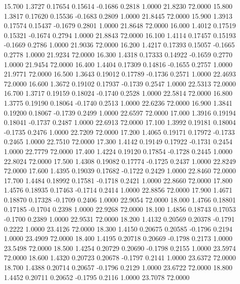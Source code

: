  15.700   1.3727   0.17654   0.15614  -0.1686   0.2818   1.0000  21.8230  72.0000
  15.800   1.3817   0.17620   0.15536  -0.1683   0.2809   1.0000  21.8445  72.0000
  15.900   1.3913   0.17574   0.15437  -0.1679   0.2801   1.0000  21.8648  72.0000
  16.000   1.4012   0.17519   0.15321  -0.1674   0.2794   1.0000  21.8843  72.0000
  16.100   1.4114   0.17457   0.15193  -0.1669   0.2786   1.0000  21.9036  72.0000
  16.200   1.4217   0.17393   0.15057  -0.1665   0.2778   1.0000  21.9234  72.0000
  16.300   1.4318   0.17333   0.14922  -0.1659   0.2770   1.0000  21.9454  72.0000
  16.400   1.4404   0.17309   0.14816  -0.1655   0.2757   1.0000  21.9771  72.0000
  16.500   1.3643   0.19012   0.17789  -0.1736   0.2571   1.0000  22.4693  72.0000
  16.600   1.3672   0.19102   0.17937  -0.1739   0.2547   1.0000  22.5313  72.0000
  16.700   1.3717   0.19159   0.18024  -0.1740   0.2528   1.0000  22.5814  72.0000
  16.800   1.3775   0.19190   0.18064  -0.1740   0.2513   1.0000  22.6236  72.0000
  16.900   1.3841   0.19200   0.18067  -0.1739   0.2499   1.0000  22.6597  72.0000
  17.000   1.3916   0.19194   0.18041  -0.1737   0.2487   1.0000  22.6913  72.0000
  17.100   1.3992   0.19181   0.18004  -0.1735   0.2476   1.0000  22.7209  72.0000
  17.200   1.4065   0.19171   0.17972  -0.1733   0.2465   1.0000  22.7510  72.0000
  17.300   1.4142   0.19149   0.17922  -0.1731   0.2454   1.0000  22.7779  72.0000
  17.400   1.4224   0.19120   0.17854  -0.1728   0.2445   1.0000  22.8024  72.0000
  17.500   1.4308   0.19082   0.17774  -0.1725   0.2437   1.0000  22.8249  72.0000
  17.600   1.4395   0.19039   0.17682  -0.1722   0.2429   1.0000  22.8460  72.0000
  17.700   1.4484   0.18992   0.17581  -0.1718   0.2421   1.0000  22.8660  72.0000
  17.800   1.4576   0.18935   0.17463  -0.1714   0.2414   1.0000  22.8856  72.0000
  17.900   1.4671   0.18870   0.17328  -0.1709   0.2406   1.0000  22.9054  72.0000
  18.000   1.4766   0.18801   0.17185  -0.1704   0.2398   1.0000  22.9268  72.0000
  18.100   1.4856   0.18743   0.17053  -0.1700   0.2389   1.0000  22.9531  72.0000
  18.200   1.4132   0.20569   0.20378  -0.1791   0.2222   1.0000  23.4126  72.0000
  18.300   1.4150   0.20675   0.20585  -0.1796   0.2194   1.0000  23.4909  72.0000
  18.400   1.4195   0.20718   0.20669  -0.1798   0.2173   1.0000  23.5498  72.0000
  18.500   1.4254   0.20729   0.20690  -0.1798   0.2155   1.0000  23.5974  72.0000
  18.600   1.4320   0.20723   0.20678  -0.1797   0.2141   1.0000  23.6372  72.0000
  18.700   1.4388   0.20714   0.20657  -0.1796   0.2129   1.0000  23.6722  72.0000
  18.800   1.4452   0.20711   0.20652  -0.1795   0.2116   1.0000  23.7078  72.0000
